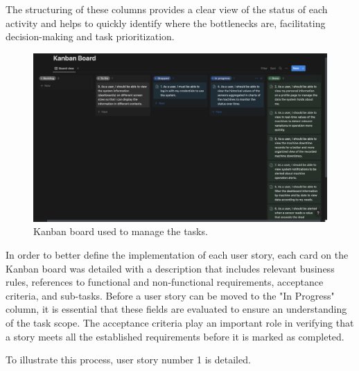 The structuring of these columns provides a clear view of the status of each activity and helps to quickly identify where the bottlenecks are, facilitating decision-making and task prioritization.

\begin{figure}[htbp]
	\centering
	\includegraphics[width=\textwidth]{images/kanban_board}
	\caption{Kanban board used to manage the tasks.}
	\label{fig:BoardKanban}
\end{figure}

In order to better define the implementation of each user story, each card on the Kanban board was detailed with a description that includes relevant business rules, references to functional and non-functional requirements, acceptance criteria, and sub-tasks. Before a user story can be moved to the "In Progress" column, it is essential that these fields are evaluated to ensure an understanding of the task scope. The acceptance criteria play an important role in verifying that a story meets all the established requirements before it is marked as completed.

To illustrate this process, user story number 1 is detailed.

